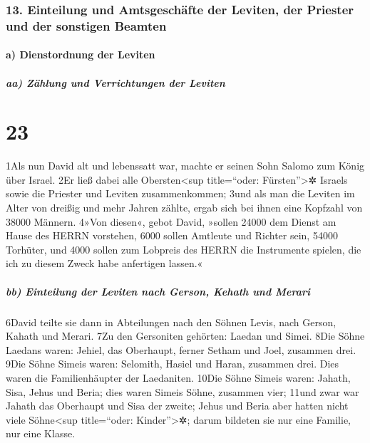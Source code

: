 \hypertarget{einteilung-und-amtsgeschuxe4fte-der-leviten-der-priester-und-der-sonstigen-beamten}{%
\subsubsection{13. Einteilung und Amtsgeschäfte der Leviten, der
Priester und der sonstigen
Beamten}\label{einteilung-und-amtsgeschuxe4fte-der-leviten-der-priester-und-der-sonstigen-beamten}}

\hypertarget{a-dienstordnung-der-leviten}{%
\paragraph{a) Dienstordnung der
Leviten}\label{a-dienstordnung-der-leviten}}

\hypertarget{aa-zuxe4hlung-und-verrichtungen-der-leviten}{%
\subparagraph{aa) Zählung und Verrichtungen der
Leviten}\label{aa-zuxe4hlung-und-verrichtungen-der-leviten}}

\hypertarget{section-22}{%
\section{23}\label{section-22}}

1Als nun David alt und lebenssatt war, machte er seinen Sohn Salomo zum
König über Israel. 2Er ließ dabei alle Obersten\textless sup
title=``oder: Fürsten''\textgreater✲ Israels sowie die Priester und
Leviten zusammenkommen; 3und als man die Leviten im Alter von dreißig
und mehr Jahren zählte, ergab sich bei ihnen eine Kopfzahl von 38000
Männern. 4»Von diesen«, gebot David, »sollen 24000 dem Dienst am Hause
des HERRN vorstehen, 6000 sollen Amtleute und Richter sein, 54000
Torhüter, und 4000 sollen zum Lobpreis des HERRN die Instrumente
spielen, die ich zu diesem Zweck habe anfertigen lassen.«

\hypertarget{bb-einteilung-der-leviten-nach-gerson-kehath-und-merari}{%
\subparagraph{bb) Einteilung der Leviten nach Gerson, Kehath und
Merari}\label{bb-einteilung-der-leviten-nach-gerson-kehath-und-merari}}

6David teilte sie dann in Abteilungen nach den Söhnen Levis, nach
Gerson, Kahath und Merari. 7Zu den Gersoniten gehörten: Laedan und
Simei. 8Die Söhne Laedans waren: Jehiel, das Oberhaupt, ferner Setham
und Joel, zusammen drei. 9Die Söhne Simeis waren: Selomith, Hasiel und
Haran, zusammen drei. Dies waren die Familienhäupter der Laedaniten.
10Die Söhne Simeis waren: Jahath, Sisa, Jehus und Beria; dies waren
Simeis Söhne, zusammen vier; 11und zwar war Jahath das Oberhaupt und
Sisa der zweite; Jehus und Beria aber hatten nicht viele
Söhne\textless sup title=``oder: Kinder''\textgreater✲; darum bildeten
sie nur eine Familie, nur eine Klasse.

